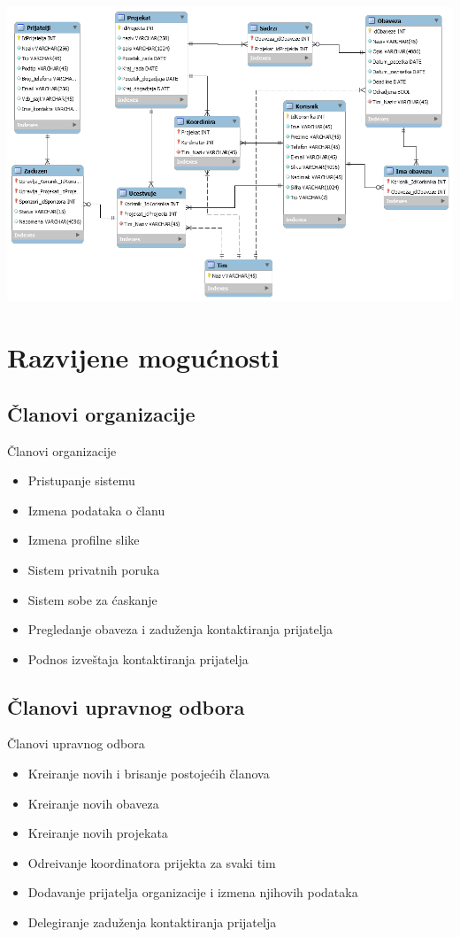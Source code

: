 \documentclass[xcolor={dvipsnames}, 11pt]{beamer}
\begin{document}
\begin{frame}
	\includegraphics[width=\linewidth]{shema.png}
\end{frame}

\section{Razvijene mogu\' cnosti}

\subsection{\v Clanovi organizacije}
\begin{frame}{\v Clanovi organizacije}
	\begin{itemize}
		\item Pristupanje sistemu
		\item Izmena podataka o \v clanu
		\item Izmena profilne slike
		\item Sistem privatnih poruka
		\item Sistem sobe za \' caskanje
		\item Pregledanje obaveza i zadu\v zenja kontaktiranja prijatelja
		\item Podnos izve\v staja kontaktiranja prijatelja
	\end{itemize}
\end{frame}

\subsection{\v Clanovi upravnog odbora}
\begin{frame}{\v Clanovi upravnog odbora}
	\begin{itemize}
		\item Kreiranje novih i brisanje postoje\' cih \v clanova
		\item Kreiranje novih obaveza
		\item Kreiranje novih projekata
		\item Odre\dj ivanje koordinatora prijekta za svaki tim
		\item Dodavanje prijatelja organizacije i izmena njihovih podataka
		\item Delegiranje zadu\v zenja kontaktiranja prijatelja
	\end{itemize}
\end{frame}
\end{document}
